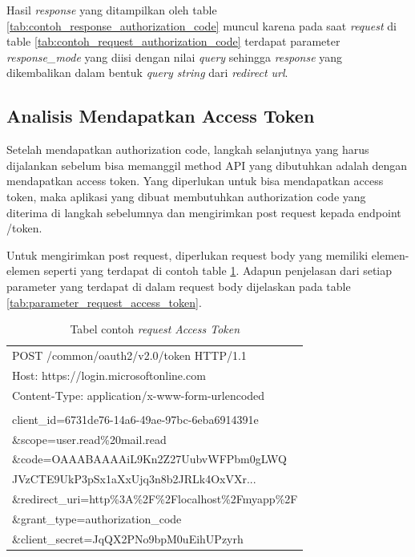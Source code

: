 Hasil \textit{response} yang ditampilkan oleh table \ref{tab:contoh_response_authorization_code} muncul karena pada saat \textit{request} di table \ref{tab:contoh_request_authorization_code} terdapat parameter \textit{response\_mode} yang diisi dengan nilai \textit{query} sehingga \textit{response} yang dikembalikan dalam bentuk \textit{query string} dari \textit{redirect url}. 

\subsection{Analisis Mendapatkan Access Token}
\label{analisis_access_token}

Setelah mendapatkan authorization code, langkah selanjutnya yang harus dijalankan sebelum bisa memanggil method API yang dibutuhkan adalah dengan mendapatkan access token. Yang diperlukan untuk bisa mendapatkan access token, maka aplikasi yang dibuat membutuhkan authorization code yang diterima di langkah sebelumnya dan mengirimkan post request kepada endpoint /token. 

Untuk mengirimkan post request, diperlukan request body yang memiliki elemen-elemen seperti yang terdapat di contoh table \ref{tab:contoh_request_access_token}. Adapun penjelasan dari setiap parameter yang terdapat di dalam request body dijelaskan pada table \ref{tab:parameter_request_access_token}. 

\begin{table}[H]
	\centering 
	\caption{Tabel contoh \textit{request} \textit{Access Token}}
	\label{tab:contoh_request_access_token}
	\begin{tabular}{|p{12cm}|}
	\toprule
	POST /common/oauth2/v2.0/token HTTP/1.1\\
Host: https://login.microsoftonline.com\\
Content-Type: application/x-www-form-urlencoded\\
\\
client\_id=6731de76-14a6-49ae-97bc-6eba6914391e\\
\&scope=user.read\%20mail.read\\
\&code=OAAABAAAAiL9Kn2Z27UubvWFPbm0gLWQ\\
JVzCTE9UkP3pSx1aXxUjq3n8b2JRLk4OxVXr...\\
\&redirect\_uri=http\%3A\%2F\%2Flocalhost\%2Fmyapp\%2F\\
\&grant\_type=authorization\_code\\
\&client\_secret=JqQX2PNo9bpM0uEihUPzyrh \\ 
	\bottomrule
	\end{tabular}  
\end{table}


